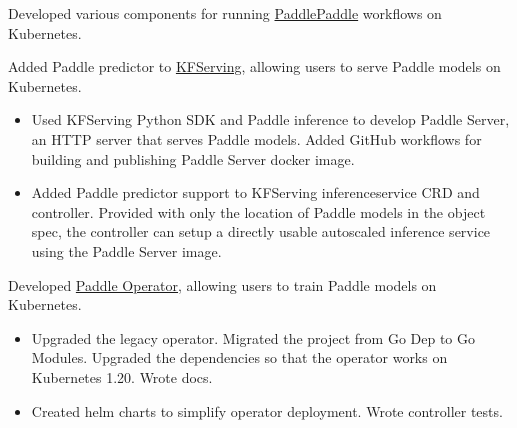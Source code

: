 
Developed various components for running \href{https://github.com/PaddlePaddle}{PaddlePaddle} workflows on Kubernetes.

\begin{miniItemize}
    \item Added Paddle predictor to \href{https://github.com/kubeflow/kfserving}{KFServing}, allowing users to serve Paddle models on Kubernetes.
    \begin{itemize}[after=\vspace{0ex}]
        \item Used KFServing Python SDK and Paddle inference to develop Paddle Server, an HTTP server that serves Paddle models. Added GitHub workflows for building and publishing Paddle Server docker image.
        \item Added Paddle predictor support to KFServing inferenceservice CRD and controller. Provided with only the location of Paddle models in the object spec, the controller can setup a directly usable autoscaled inference service using the Paddle Server image.
    \end{itemize}
    \item Developed \href{https://github.com/PaddleFlow/paddle-operator}{Paddle Operator}, allowing users to train Paddle models on Kubernetes.
    \begin{itemize}[after=\vspace{0ex}]
        \item Upgraded the legacy operator. Migrated the project from Go Dep to Go Modules. Upgraded the dependencies so that the operator works on Kubernetes 1.20. Wrote docs.
        \item Created helm charts to simplify operator deployment. Wrote controller tests.
    \end{itemize}
\end{miniItemize}
